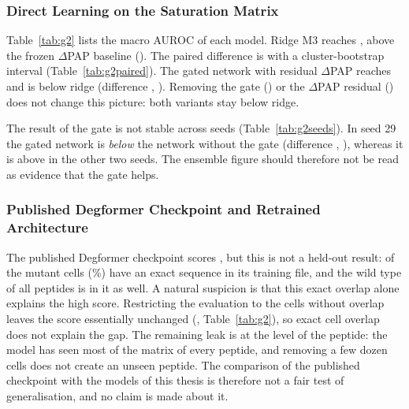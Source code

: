 \subsubsection{Direct Learning on the Saturation Matrix}
Table~\ref{tab:g2} lists the macro AUROC of each model. Ridge M3 reaches \nAucRidge{}, above the frozen
$\Delta$PAP baseline (\nAucDPAP{}). The paired difference is \nDRidgeDPAP{} with a cluster-bootstrap interval
\nCIRidgeDPAP{} (Table~\ref{tab:g2paired}). The gated network with residual $\Delta$PAP reaches \nAucGatePap{}
and is below ridge (difference \nDGateRidge{}, \nCIGateRidge{}). Removing the gate (\nAucNoGate{}) or the
$\Delta$PAP residual (\nAucGateNoPap{}) does not change this picture: both variants stay below ridge.

\begin{table}[htbp]
  \centering
  \caption{Macro AUROC on the \nNPep{} peptides of the saturation benchmark. The last column keeps only the cells
  whose exact sequence is not in the training data of the published Degformer.}\label{tab:g2}
  
\end{table}

\begin{table}[htbp]
  \centering
  \caption{Paired AUROC differences between models}\label{tab:g2paired}
  
\end{table}

The result of the gate is not stable across seeds (Table~\ref{tab:g2seeds}). In seed 29 the gated network is
\emph{below} the network without the gate (difference \nSeedFlipDelta{}, \nSeedFlipCI{}), whereas it is above in the other
two seeds. The ensemble figure should therefore not be read as evidence that the gate helps.

\begin{table}[htbp]
  \centering
  \caption{Per-seed AUROC of the three main models}\label{tab:g2seeds}
  
\end{table}

\subsubsection{Published Degformer Checkpoint and Retrained Architecture}\label{sec:res-degformer}
The published Degformer checkpoint scores \nAucDegOfficial{}, but this is not a held-out result: \nOverlapCells{} of the
\nNCellsEOne{} mutant cells (\nOverlapPct\%) have an exact sequence in its training file, and the wild type of
all \nNPep{} peptides is in it as well. A natural suspicion is that this exact overlap alone explains the high score.
Restricting the evaluation to the \nNonOverlapCells{} cells without overlap leaves the score essentially unchanged
(\nAucDegNonOverlap{}, Table~\ref{tab:g2}), so exact cell overlap does not explain the gap. The remaining leak is at
the level of the peptide: the model has seen most of the matrix of every peptide, and removing a few dozen cells does
not create an unseen peptide. The comparison of the published checkpoint with the models of this thesis is
therefore not a fair test of generalisation, and no claim is made about it.

